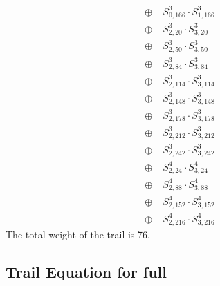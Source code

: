 \begin{align*}
\oplus\; & S^3_{0,166} \cdot S^3_{1,166}\tag*{weight 1}\\
\oplus\; & S^3_{2,20} \cdot S^3_{3,20}\tag*{weight 1}\\
\oplus\; & S^3_{2,50} \cdot S^3_{3,50}\tag*{weight 1}\\
\oplus\; & S^3_{2,84} \cdot S^3_{3,84}\tag*{weight 1}\\
\oplus\; & S^3_{2,114} \cdot S^3_{3,114}\tag*{weight 1}\\
\oplus\; & S^3_{2,148} \cdot S^3_{3,148}\tag*{weight 1}\\
\oplus\; & S^3_{2,178} \cdot S^3_{3,178}\tag*{weight 1}\\
\oplus\; & S^3_{2,212} \cdot S^3_{3,212}\tag*{weight 1}\\
\oplus\; & S^3_{2,242} \cdot S^3_{3,242}\tag*{weight 1}\\
\oplus\; & S^4_{2,24} \cdot S^4_{3,24}\tag*{weight 1}\\
\oplus\; & S^4_{2,88} \cdot S^4_{3,88}\tag*{weight 1}\\
\oplus\; & S^4_{2,152} \cdot S^4_{3,152}\tag*{weight 1}\\
\oplus\; & S^4_{2,216} \cdot S^4_{3,216}\tag*{weight 1}
\end{align*}
The total weight of the trail is 76.

\ifcameraready
\else

\subsection{Trail Equation for full \MORUS[640]}

